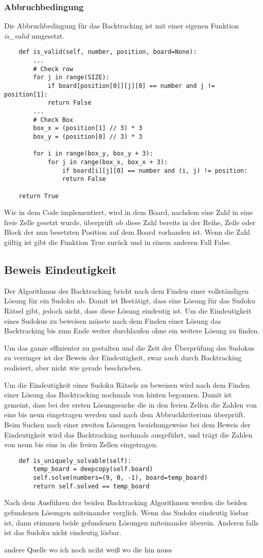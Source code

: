 \subsubsection{Abbruchbedingung}
Die Abbruchbedingung für das Backtracking ist mit einer eigenen Funktion \textit{is\_valid} umgesetzt.
\begin{lstlisting}
	def is_valid(self, number, position, board=None):
		...
		# Check row
		for j in range(SIZE):
			if board[position[0]][j][0] == number and j != position[1]:
			return False
		...
		# Check Box
		box_x = (position[1] // 3) * 3
		box_y = (position[0] // 3) * 3
		
		for i in range(box_y, box_y + 3):
			for j in range(box_x, box_x + 3):
				if board[i][j][0] == number and (i, j) != position:
				return False
		
	return True
\end{lstlisting}
Wie in dem Code implementiert, wird in dem Board, nachdem eine Zahl in eine freie Zelle gesetzt wurde, überprüft ob diese Zahl bereits in der Reihe, Zeile oder Block der nun besetzten Position auf dem Board vorhanden ist. Wenn die Zahl gültig ist gibt die Funktion True zurück und in einem anderen Fall False. \cite{knott_2017} 

\subsection{Beweis Eindeutigkeit}
Der Algorithmus des Backtracking bricht nach dem Finden einer vollständigen Lösung für ein Sudoku ab. Damit ist Bestätigt, dass eine Lösung für das Sudoku Rätsel gibt, jedoch nicht, dass diese Lösung eindeutig ist. Um die Eindeutigkeit eines Sudokus zu beweisen müsste nach dem Finden einer Lösung das Backtracking bis zum Ende weiter durchlaufen ohne ein weitere Lösung zu finden. 

Um das ganze effizienter zu gestalten und die Zeit der Überprüfung des Sudokus zu verringer ist der Beweis der Eindeutigkeit, zwar auch durch Backtracking realisiert, aber nicht wie gerade beschrieben.

Um die Eindeutigkeit eines Sudoku Rätsels zu beweisen wird nach dem Finden einer Lösung das Backtracking nochmals von hinten begonnen. Damit ist gemeint, dass bei der ersten Lösungssuche die in den freien Zellen die Zahlen von eins bis neun eingetragen werden und nach dem Abbruchkriterium überprüft. Beim Suchen nach einer zweiten Lösungen beziehungsweise bei dem Beweis der Eindeutigkeit wird das Backtracking nochmals ausgeführt, und trägt die Zahlen von neun bis eins in die freien Zellen eingetragen. 

\begin{lstlisting}
	def is_uniquely_solvable(self):
		temp_board = deepcopy(self.board)
		self.solve(numbers=(9, 0, -1), board=temp_board)
		return self.solved == temp_board
\end{lstlisting}
Nach dem Ausführen der beiden Backtracking Algorithmen werden die beiden gefundenen Lösungen miteinander verglich. Wenn das Sudoku eindeutig lösbar ist, dann stimmen beide gefundenen Lösungen miteinander überein. Anderen falls ist das Sudoku nicht eindeutig lösbar.

andere Quelle wo ich noch nciht weiß wo die hin muss\cite{jehne2013mathematische}